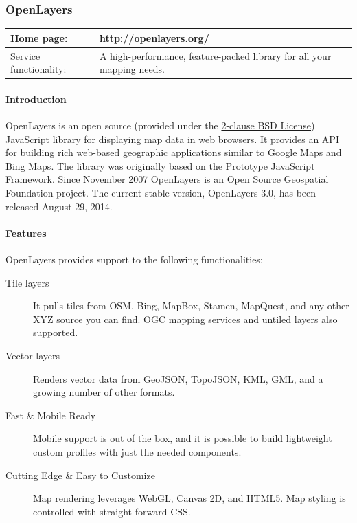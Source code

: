 \documentclass[11pt,a4paper,titlepage,oneside]{report}
\begin{document}
  \subsubsection{OpenLayers}
  \begin{tabular}{|p{4cm}|p{8cm}|}
    \hline
    Home page: & \url{http://openlayers.org/} \\
    \hline
    Service functionality: & A high-performance, feature-packed library for all your mapping needs. \\
    \hline
  \end{tabular}
  
  \paragraph{Introduction} \indent
  OpenLayers is an open source (provided under the \href{'https://github.com/Leaflet/Leaflet/blob/master/LICENSE'}{2-clause BSD License}) JavaScript library for displaying map data in web browsers. It provides an API for building rich web-based geographic applications similar to Google Maps and Bing Maps. The library was originally based on the Prototype JavaScript Framework. Since November 2007 OpenLayers is an Open Source Geospatial Foundation project.
  The current stable version, OpenLayers 3.0, has been released August 29, 2014.

  \paragraph{Features}
  OpenLayers provides support to the following functionalities:

  \begin{description}
    \item[Tile layers] It pulls tiles from OSM, Bing, MapBox, Stamen, MapQuest, and any other XYZ source you can find. OGC mapping services and untiled layers also supported.
    \item[Vector layers] Renders vector data from GeoJSON, TopoJSON, KML, GML, and a growing number of other formats.
    \item[Fast \& Mobile Ready] Mobile support is out of the box, and it is possible to build lightweight custom profiles with just the needed components.
    \item[Cutting Edge \& Easy to Customize] Map rendering leverages WebGL, Canvas 2D, and HTML5. Map styling is controlled with straight-forward CSS.
  \end{description}
\end{document}
